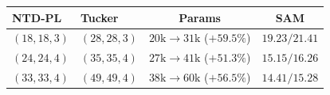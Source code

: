 \setlength{\tabcolsep}{2.7pt}
\begin{tabular}{@{}l l c c@{}}
\toprule
NTD-PL & Tucker & Params & SAM \\
\midrule
\((18,18,3)\) & \((28,28,3)\) & \(20\mathrm{k}\!\to\!31\mathrm{k}\) (\(+59.5\%\)) & \(\mathbf{19.23}/21.41\) \\
\((24,24,4)\) & \((35,35,4)\) & \(27\mathrm{k}\!\to\!41\mathrm{k}\) (\(+51.3\%\)) & \(\mathbf{15.15}/16.26\) \\
\((33,33,4)\) & \((49,49,4)\) & \(38\mathrm{k}\!\to\!60\mathrm{k}\) (\(+56.5\%\)) & \(\mathbf{14.41}/15.28\) \\
\bottomrule
\end{tabular}
